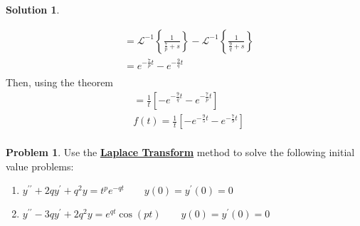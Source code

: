 \documentclass[10pt]{article}
\theoremstyle{definition}
\newtheorem{problem}{Problem}
\newtheorem{soln}{Solution}
\newcommand{\laplacei}[1]{\mathcal{L}^{-1}\left\{#1\right\}}
\begin{document}
\begin{soln}
\begin{enumerate}[label=(\alph*)]
\begin{align*}
             & =\laplacei{\frac{1}{\frac{7}{p}+s}}-\laplacei{\frac{1}{\frac{9}{q}+s}} \\
             & =e^{-\frac{7}{p}t}-e^{-\frac{9}{q}t}                                   \\
          \end{align*}
          Then, using the theorem
          \begin{align*}
             & =\frac{1}{t}\left[-e^{-\frac{9}{q}t}-e^{-\frac{7}{p}t}\right]     \\
             & f(t)=\frac{1}{t}\left[-e^{-\frac{9}{5}t}-e^{-\frac{7}{9}t}\right] \\
          \end{align*}
  \end{enumerate}
\end{soln}
\begin{problem}
Use the \textbf{\underline{Laplace Transform}} method to solve the following initial value problems:
\begin{enumerate}[label=(\alph*)]
  \item $\displaystyle y^{\prime\prime}+2qy^\prime+q^2y=t^pe^{-qt}\qquad y(0)=y^\prime(0)=0$
  \item $\displaystyle y^{\prime\prime}-3qy^\prime+2q^2y=e^{qt}\cos\left(pt\right)\qquad y(0)=y^\prime(0)=0$
\end{enumerate}
\end{problem}
\end{document}
